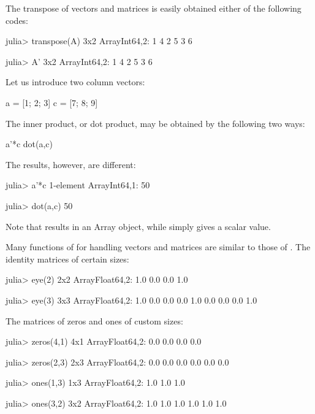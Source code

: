 The transpose of vectors and matrices is easily obtained either of the following codes:
\begin{code}
julia> transpose(A)
3x2 Array{Int64,2}:
 1  4
 2  5
 3  6

julia> A'
3x2 Array{Int64,2}:
 1  4
 2  5
 3  6
\end{code}



Let us introduce two column vectors:
\begin{code}
a = [1; 2; 3]
c = [7; 8; 9]
\end{code}
\noindent The inner product, or dot product, may be obtained by the following two ways:
\begin{code}
a'*c
dot(a,c)
\end{code}
\noindent The results, however, are different:
\begin{code}
julia> a'*c
1-element Array{Int64,1}:
 50

julia> dot(a,c)
50
\end{code}
\noindent Note that  results in an Array object, while  simply gives a scalar value.

Many functions of \julia{} for handling vectors and matrices are similar to those of \matlab{}. The identity matrices of certain sizes:
\begin{code}
julia> eye(2)
2x2 Array{Float64,2}:
 1.0  0.0
 0.0  1.0

julia> eye(3)
3x3 Array{Float64,2}:
 1.0  0.0  0.0
 0.0  1.0  0.0
 0.0  0.0  1.0
\end{code}
\noindent The matrices of zeros and ones of custom sizes:
\begin{code}
julia> zeros(4,1)
4x1 Array{Float64,2}:
 0.0
 0.0
 0.0
 0.0

julia> zeros(2,3)
2x3 Array{Float64,2}:
 0.0  0.0  0.0
 0.0  0.0  0.0

julia> ones(1,3)
1x3 Array{Float64,2}:
 1.0  1.0  1.0

julia> ones(3,2)
3x2 Array{Float64,2}:
 1.0  1.0
 1.0  1.0
 1.0  1.0
\end{code}

